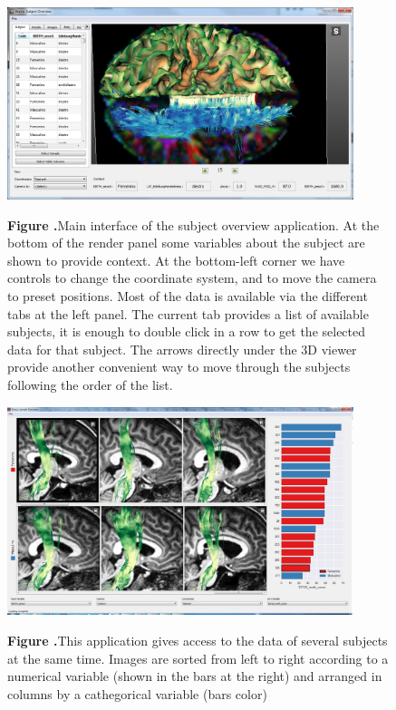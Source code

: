 \documentclass[utf8,paper]{frontiersSCNS} %
\begin{document}
\begin{figure}[h!]
\begin{center}
\includegraphics[width=0.9\textwidth]{figures/subj_overview_full.PNG}
\end{center}
 \textbf{\label{fig_subject} Figure .}{Main interface of the subject overview application. At the bottom of the render panel some variables about the subject are shown to provide context. At the bottom-left corner we have controls to change the coordinate system, and to move the camera to preset positions. Most of the data is available via the different tabs at the left panel. The current tab provides a list of available subjects, it is enough to double click in a row to get the selected data for that subject. The arrows directly under the 3D viewer provide another convenient way to move through the subjects following the order of the list. }
\end{figure}

\begin{figure}[h!]
\begin{center}
\includegraphics[width=0.9\textwidth]{figures/sample_overview.PNG}
\end{center}
 \textbf{\label{fig_sample} Figure .}{This application gives access to the data of several subjects at the same time. Images are sorted from left to right according to a numerical variable (shown in the bars at the right) and arranged in columns by a cathegorical variable (bars color)  }
\end{figure}
\end{document}

